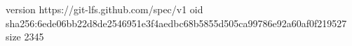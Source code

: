 version https://git-lfs.github.com/spec/v1
oid sha256:6ede06bb22d8de2546951e3f4aedbc68b5855d505ca99786e92a60af0f219527
size 2345
